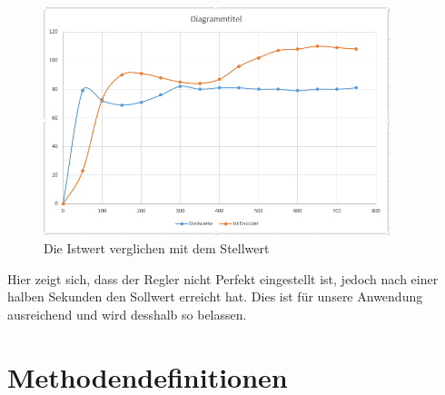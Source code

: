 \documentclass[a4paper, 10pt, fleqn]{article}
\begin{document}
\begin{figure}[H]%
\centering
\includegraphics[width=0.9\textwidth]{Images/PID auf 150mms.PNG}
\caption{Die Istwert verglichen mit dem Stellwert}
\label{fig:IstSollwertVergleich}
\end{figure}
Hier zeigt sich, dass der Regler nicht Perfekt eingestellt ist, jedoch nach einer halben Sekunden den Sollwert erreicht hat. Dies ist für unsere Anwendung ausreichend und wird desshalb so belassen.
\section{Methodendefinitionen}
\end{document}

